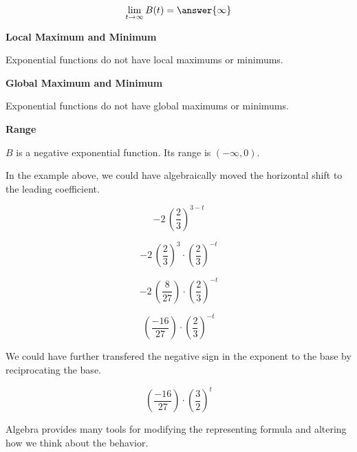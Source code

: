 \documentclass{ximera}
\begin{document}
\begin{example}
\[
\lim\limits_{t \to \infty}B(t) = \answer{\infty}
\]





\textbf{Local Maximum and Minimum}

Exponential functions do not have local maximums or minimums.






\textbf{Global Maximum and Minimum}

Exponential functions do not have global maximums or minimums.




\textbf{Range}



$B$ is a negative exponential function.   Its range is $(-\infty, 0)$.







\end{example}

























In the example above, we could have algebraically moved the horizontal shift to the leading coefficient.



\[
-2 \, \left( \frac{2}{3} \right)^{3-t}
\]


\[
-2 \, \left( \frac{2}{3} \right)^{3} \cdot \left( \frac{2}{3} \right)^{-t}
\]


\[
-2 \, \left( \frac{8}{27} \right)  \cdot \left( \frac{2}{3} \right)^{-t}
\]


\[
\left( \frac{-16}{27} \right)  \cdot \left( \frac{2}{3} \right)^{-t}
\]


We could have further transfered the negative sign in the exponent to the base by reciprocating the base.

\[
\left( \frac{-16}{27} \right)  \cdot \left( \frac{3}{2} \right)^t
\]



Algebra provides many tools for modifying the representing formula and altering how we think about the behavior. \\
\end{document}
